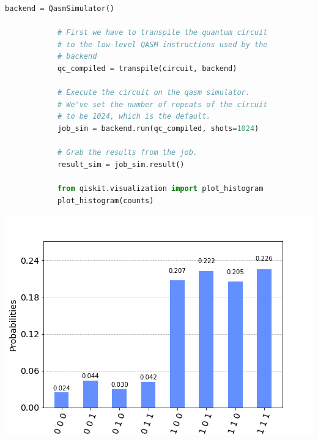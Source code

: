 \documentclass[12pt, a4paper]{article}
\begin{document}
\begin{enumerate}
\begin{lstlisting}[language=Python, caption= Simulation and Visualization]
			backend = QasmSimulator()
			
			# First we have to transpile the quantum circuit
			# to the low-level QASM instructions used by the
			# backend
			qc_compiled = transpile(circuit, backend)
			
			# Execute the circuit on the qasm simulator.
			# We've set the number of repeats of the circuit
			# to be 1024, which is the default.
			job_sim = backend.run(qc_compiled, shots=1024)
			
			# Grab the results from the job.
			result_sim = job_sim.result()
			
			from qiskit.visualization import plot_histogram
			plot_histogram(counts)
		\end{lstlisting}
		\begin{center}
			\includegraphics[scale=0.5]{hist.png}
		\end{center}
		
	
	\end{enumerate}
\end{document}
